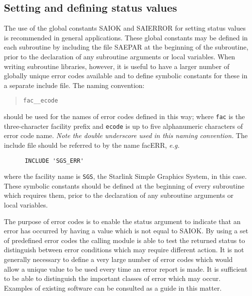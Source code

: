 \documentclass[twoside,11pt]{article}
\newcommand{\xlabel}[1]{}
\renewcommand{\_}{\texttt{\symbol{95}}}
\begin{document}
\subsection{\xlabel{setting_and_defining_status_values}Setting and defining status values \label{def_sect}}

The use of the global constants SAI\_\_OK and SAI\_\_ERROR for setting
status values is recommended in general applications. 
These global constants may be defined in each subroutine by including the
file SAE\_PAR at the beginning of the subroutine, prior to the declaration
of any subroutine arguments or local variables. 
When writing subroutine libraries, however, it is useful to have a larger 
number of globally unique error codes available and to define symbolic
constants for these in a separate include 
file.
The naming convention:

\begin {quote}
\begin {small}
\begin{verbatim}
fac__ecode
\end{verbatim}
\end {small}
\end {quote}

should be used for the names of error codes defined in this way; where 
\texttt{fac} is the three-character facility prefix and \texttt{ecode} is up 
to five alphanumeric characters of error code name. 
\emph{Note the double underscore used in this naming convention.}
The include file should be referred to by the name fac\_ERR, \textit{e.g.}

\begin {small}
\begin{verbatim}
      INCLUDE 'SGS_ERR'
\end{verbatim}
\end {small}

where the facility name is \texttt{SGS}, the Starlink Simple Graphics System,
in this case. 
These symbolic constants should be defined at the beginning of every
subroutine which requires them, prior to the declaration of any subroutine
arguments or local variables. 

The purpose of error codes is to enable the status argument to indicate that an 
error has occurred by having a value which is not equal to SAI\_\_OK.
By using a set of predefined error codes the calling module is 
able to test the returned status to distinguish between error conditions 
which may require different action.
It is not generally necessary to define a very large number of error codes
which would allow a unique value to be used every time an error report is
made. 
It is sufficient to be able to distinguish the important classes of error which
may occur. 
Examples of existing software can be consulted as a guide in this matter.
\end{document}
